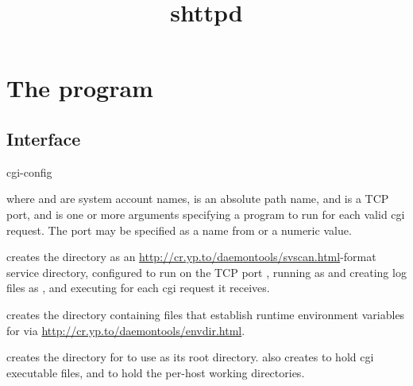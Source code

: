 \documentclass{book}
\title{shttpd}
\begin{document}
\section{The  program}

\subsection{Interface}
\begin{code}
  cgi-config     
\end{code}
where  and  are system account names,
 is an absolute path name, and  is a TCP port,
and  is one or more arguments specifying a program to run
for each valid cgi request.  The port may be specified as a name from
 or a numeric value.

 creates the directory  as an
\href{svscan}{http://cr.yp.to/daemontools/svscan.html}-format service
directory, configured to run  on the TCP port
, running  as  and creating log
files as , and executing  for each cgi
request it receives.

 creates the directory 
containing files that establish runtime environment variables for
 via \href{envdir}{http://cr.yp.to/daemontools/envdir.html}.

 creates the directory  for
 to use as its root directory.   also
creates  to hold cgi executable files, and
 to hold the per-host working directories.
\end{document}

